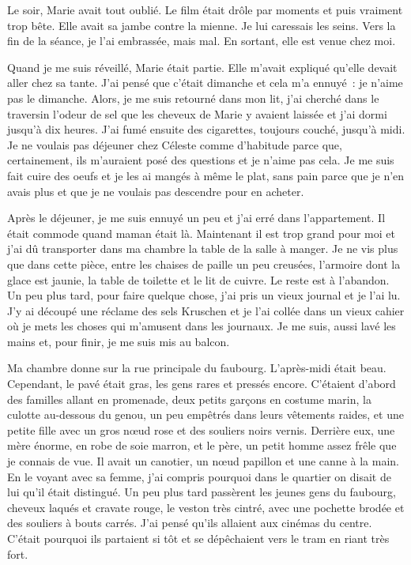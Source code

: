 \documentclass[french,twoside]{book} %
\begin{document}
Le soir, Marie avait tout oublié. Le film était drôle par moments et puis vraiment trop bête. Elle avait sa jambe contre la mienne. Je lui caressais les seins. Vers la fin de la séance, je l’ai embrassée, mais mal. En sortant, elle est venue chez moi.\par
Quand je me suis réveillé, Marie était partie. Elle m’avait expliqué qu’elle devait aller chez sa tante. J'ai pensé que c’était dimanche et cela m’a ennuyé : je n’aime pas le dimanche. Alors, je me suis retourné dans mon lit, j’ai cherché dans le traversin l’odeur de sel que les cheveux de Marie y avaient laissée et j’ai dormi jusqu’à dix heures. J'ai fumé ensuite des cigarettes, toujours couché, jusqu’à midi. Je ne voulais pas déjeuner chez Céleste comme d’habitude parce que, certainement, ils m’auraient posé des questions et je n’aime pas cela. Je me suis fait cuire des oeufs et je les ai mangés à même le plat, sans pain parce que je n’en avais plus et que je ne voulais pas descendre pour en acheter.\par
Après le déjeuner, je me suis ennuyé un peu et j’ai erré dans l’appartement. Il était commode quand maman était là. Maintenant il est trop grand pour moi et j’ai dû transporter dans ma chambre la table de la salle à manger. Je ne vis plus que dans cette pièce, entre les chaises de paille un peu creusées, l’armoire dont la glace est jaunie, la table de toilette et le lit de cuivre. Le reste est à l’abandon. Un peu plus tard, pour faire quelque chose, j’ai pris un vieux journal et je l’ai lu. J'y ai découpé une réclame des sels Kruschen et je l’ai collée dans un vieux cahier où je mets les choses qui m’amusent dans les journaux. Je me suis, aussi lavé les mains et, pour finir, je me suis mis au balcon.\par
Ma chambre donne sur la rue principale du faubourg. L'après-midi était beau. Cependant, le pavé était gras, les gens rares et pressés encore. C'étaient d’abord des familles allant en promenade, deux petits garçons en costume marin, la culotte au-dessous du genou, un peu empêtrés dans leurs vêtements raides, et une petite fille avec un gros nœud rose et des souliers noirs vernis. Derrière eux, une mère énorme, en robe de soie marron, et le père, un petit homme assez frêle que je connais de vue. Il avait un canotier, un nœud papillon et une canne à la main. En le voyant avec sa femme, j’ai compris pourquoi dans le quartier on disait de lui qu’il était distingué. Un peu plus tard passèrent les jeunes gens du faubourg, cheveux laqués et cravate rouge, le veston très cintré, avec une pochette brodée et des souliers à bouts carrés. J'ai pensé qu’ils allaient aux cinémas du centre. C'était pourquoi ils partaient si tôt et se dépêchaient vers le tram en riant très fort.\par
\end{document}
